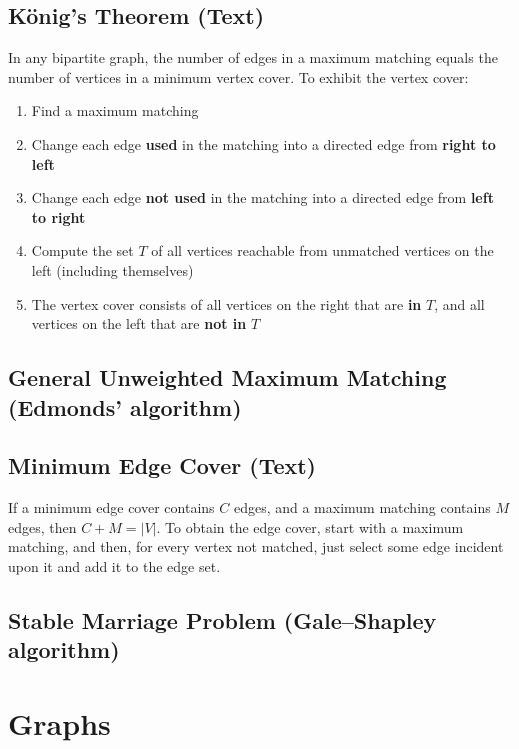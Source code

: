 \documentclass[9pt]{extarticle}
\begin{document}
\begin{multicols*}{3}
\subsection{K\"onig's Theorem (Text)} %
In any bipartite graph, the number of edges in a maximum matching equals the
number of vertices in a minimum vertex cover. To exhibit the vertex cover:
\begin{enumerate}
\item Find a maximum matching
\item Change each edge \textbf{used} in the matching into a directed edge from
\textbf{right to left}
\item Change each edge \textbf{not used} in the matching into a directed edge
from \textbf{left to right}
\item Compute the set $T$ of all vertices reachable from unmatched vertices on
the left (including themselves)
\item The vertex cover consists of all vertices on the right that are
\textbf{in} $T$, and all vertices on the left that are \textbf{not in} $T$
\end{enumerate}

\subsection{General Unweighted Maximum Matching (Edmonds' algorithm)}


\subsection{Minimum Edge Cover (Text)} %
If a minimum edge cover contains $C$ edges, and a maximum matching contains $M$
edges, then $C + M = |V|$. To obtain the edge cover, start with a maximum
matching, and then, for every vertex not matched, just select some edge
incident upon it and add it to the edge set. 

\subsection{Stable Marriage Problem (Gale--Shapley algorithm)} %


\section{Graphs}


\end{multicols*}
\end{document}
